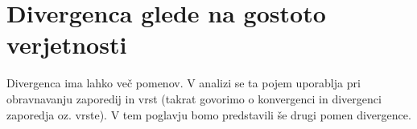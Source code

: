 \section{Divergenca glede na gostoto verjetnosti}

Divergenca ima lahko več pomenov. V analizi se ta pojem uporablja pri obravnavanju zaporedij in vrst (takrat govorimo o konvergenci in divergenci zaporedja oz. vrste). V tem poglavju bomo predstavili še drugi pomen divergence.










\pagebreak


